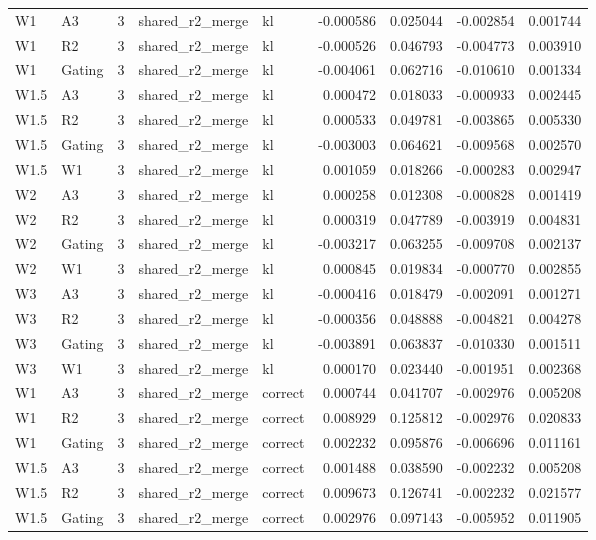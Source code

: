 \begin{tabular}{llrllrrrr}
W1 & A3 & 3 & shared_r2_merge & kl & -0.000586 & 0.025044 & -0.002854 & 0.001744 \\
W1 & R2 & 3 & shared_r2_merge & kl & -0.000526 & 0.046793 & -0.004773 & 0.003910 \\
W1 & Gating & 3 & shared_r2_merge & kl & -0.004061 & 0.062716 & -0.010610 & 0.001334 \\
W1.5 & A3 & 3 & shared_r2_merge & kl & 0.000472 & 0.018033 & -0.000933 & 0.002445 \\
W1.5 & R2 & 3 & shared_r2_merge & kl & 0.000533 & 0.049781 & -0.003865 & 0.005330 \\
W1.5 & Gating & 3 & shared_r2_merge & kl & -0.003003 & 0.064621 & -0.009568 & 0.002570 \\
W1.5 & W1 & 3 & shared_r2_merge & kl & 0.001059 & 0.018266 & -0.000283 & 0.002947 \\
W2 & A3 & 3 & shared_r2_merge & kl & 0.000258 & 0.012308 & -0.000828 & 0.001419 \\
W2 & R2 & 3 & shared_r2_merge & kl & 0.000319 & 0.047789 & -0.003919 & 0.004831 \\
W2 & Gating & 3 & shared_r2_merge & kl & -0.003217 & 0.063255 & -0.009708 & 0.002137 \\
W2 & W1 & 3 & shared_r2_merge & kl & 0.000845 & 0.019834 & -0.000770 & 0.002855 \\
W3 & A3 & 3 & shared_r2_merge & kl & -0.000416 & 0.018479 & -0.002091 & 0.001271 \\
W3 & R2 & 3 & shared_r2_merge & kl & -0.000356 & 0.048888 & -0.004821 & 0.004278 \\
W3 & Gating & 3 & shared_r2_merge & kl & -0.003891 & 0.063837 & -0.010330 & 0.001511 \\
W3 & W1 & 3 & shared_r2_merge & kl & 0.000170 & 0.023440 & -0.001951 & 0.002368 \\
W1 & A3 & 3 & shared_r2_merge & correct & 0.000744 & 0.041707 & -0.002976 & 0.005208 \\
W1 & R2 & 3 & shared_r2_merge & correct & 0.008929 & 0.125812 & -0.002976 & 0.020833 \\
W1 & Gating & 3 & shared_r2_merge & correct & 0.002232 & 0.095876 & -0.006696 & 0.011161 \\
W1.5 & A3 & 3 & shared_r2_merge & correct & 0.001488 & 0.038590 & -0.002232 & 0.005208 \\
W1.5 & R2 & 3 & shared_r2_merge & correct & 0.009673 & 0.126741 & -0.002232 & 0.021577 \\
W1.5 & Gating & 3 & shared_r2_merge & correct & 0.002976 & 0.097143 & -0.005952 & 0.011905 \\

\end{tabular}
